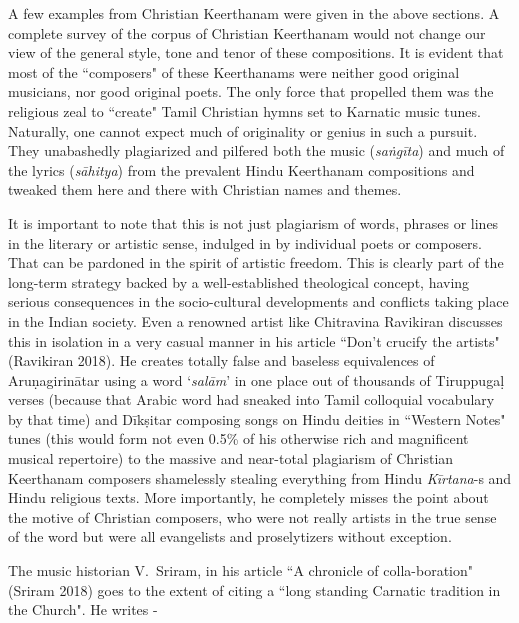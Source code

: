 A few examples from Christian Keerthanam were given in the above sections. A complete survey of the corpus of Christian Keerthanam would not change our view of the general style, tone and tenor of these compositions. It is evident that most of the ``composers" of these Keerthanams were neither good original musicians, nor good original poets. The only force that propelled them was the religious zeal to ``create" Tamil Christian hymns set to Karnatic music tunes. Naturally, one cannot expect much of originality or genius in such a pursuit. They unabashedly plagiarized and pilfered both the music (\textit{saṅgīta}) and much of the lyrics (\textit{sāhitya}) from the prevalent Hindu Keerthanam compositions and tweaked them here and there with Christian names and themes.

It is important to note that this is not just plagiarism of words, phrases or lines in the literary or artistic sense, indulged in by individual poets or composers. That can be pardoned in the spirit of artistic freedom. This is clearly part of the long-term strategy backed by a well-established theological concept, having serious consequences in the socio-cultural developments and conflicts taking place in the Indian society. Even a renowned artist like Chitravina Ravikiran discusses this in isolation in a very casual manner in his article ``Don't crucify the artists" (Ravikiran 2018). He creates totally false and baseless equivalences of Aruṇagirinātar using a word `\textit{salām}' in one place out of thousands of Tiruppugaḷ verses (because that Arabic word had sneaked into Tamil colloquial vocabulary by that time) and Dīkṣitar composing songs on Hindu deities in ``Western Notes" tunes (this would form not even 0.5\% of his otherwise rich and magnificent musical repertoire) to the massive and near-total plagiarism of Christian Keerthanam composers shamelessly stealing everything from Hindu \textit{Kīrtana}-s and Hindu religious texts. More importantly, he completely misses the point about the motive of Christian composers, who were not really artists in the true sense of the word but were all evangelists and proselytizers without exception.

The music historian V.~Sriram, in his article ``A chronicle of colla\break-boration" (Sriram 2018) goes to the extent of citing a ``long standing Carnatic tradition in the Church". He writes -

